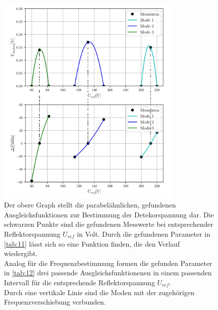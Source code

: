 \begin{figure}
    \centering
    \includegraphics[width=0.8\textwidth]{bilder/SO.jpg}
    \caption{Der obere Graph stellt die parabelähnlichen, gefundenen Ausgleichsfunktionen zur Bestimmung der Detekorspannung dar. Die schwarzen
            Punkte sind die gefundenen Messwerte bei entsprechender Reflektorspannung $U_{ref}$ in Volt. Durch die gefundenen Parameter in \ref{tab:11}
            lässt sich so eine Funktion finden, die den Verlauf wiedergibt.    \\
            Analog für die Frequenzbestimmung formen die gefunden Parameter in \ref{tab:12} drei passende Ausgleichsfunktionenen in einem passenden 
            Intervall für die entsprechende Reflektorspannung $U_{ref}$. \\
            Durch eine vertikale Linie sind die Moden mit der zugehörigen Frequenzverschiebung verbunden.} 
    \label{fig:gimp}
\end{figure}

